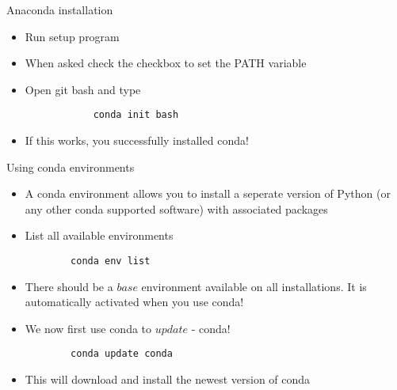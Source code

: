 \begin{frame}[fragile]{Anaconda installation}
		
		\begin{itemize}
		\item Run setup program
		\item When asked check the checkbox to set the PATH variable
		\item Open git bash and type
		
		\begin{verbatim}
			conda init bash
		\end{verbatim}
		\item If this works, you successfully installed conda!
		
		\end{itemize}
		
\end{frame}

\begin{frame}[fragile]{Using conda environments}
	
	\begin{itemize}
		\item A conda environment allows you to install a seperate version of Python (or any other conda supported software) with associated packages
		
		\item List all available environments
		\begin{verbatim}
		conda env list
		\end{verbatim}
		
		\item There should be a $base$ environment available on all installations. It is automatically activated when you use conda!
		\item We now first use conda to $update$ - conda!
		\begin{verbatim}
		conda update conda
		\end{verbatim}
		\item This will download and install the newest version of conda
	
	\end{itemize}
	
\end{frame}

